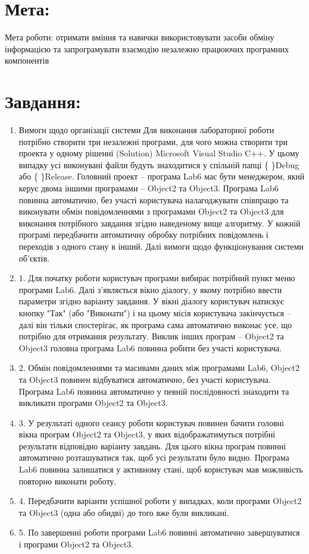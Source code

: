 \documentclass[14pt]{article}
\begin{document}

    \tableofcontents
    \newpage


    \section{Мета:}
    Мета роботи: отримати вміння та навички використовувати засоби обміну інформацією та запрограмувати взаємодію незалежно працюючих програмних компонентів


    \section{Завдання:}
    \begin{enumerate}
        \item    Вимоги щодо організації системи Для виконання лабораторної роботи потрібно створити три незалежні програми, для чого можна створити три проекта у одному рішенні (Solution) Microsoft Visual Studio C++. У цьому випадку усі виконувані файли будуть знаходитися у спільній папці \{ \}Debug або \{ \}Release. Головний проект – програма Lab6 має бути менеджером, який керує двома іншими програмами – Object2 та Object3. Програма Lab6 повинна автоматично, без участі користувача налагоджувати співпрацю та виконувати обмін повідомленнями з програмами Object2 та Object3 для виконання потрібного завдання згідно наведеному вище алгоритму. У кожній програмі передбачити автоматичну обробку потрібних повідомлень і переходів з одного стану в інший. Далі вимоги щодо функціонування системи об'єктів.
        \item    1. Для початку роботи користувач програми вибирає потрібний пункт меню програми Lab6. Далі з’являється вікно діалогу, у якому потрібно ввести параметри згідно варіанту завдання. У вікні діалогу користувач натискує кнопку "Так" (або "Виконати") і на цьому місія користувача закінчується – далі він тільки спостерігає, як програма сама автоматично виконає усе, що потрібно для отримання результату. Виклик інших програм – Object2 та Object3 головна програма Lab6 повинна робити без участі користувача.
        \item    2. Обмін повідомленнями та масивами даних між програмами Lab6, Object2 та Object3 повинен відбуватися автоматично, без участі користувача. Програма Lab6 повинна автоматично у певній послідовності знаходити та викликати програми Object2 та Object3.
        \item    3. У результаті одного сеансу роботи користувач повинен бачити головні вікна програм Object2 та Object3, у яких відображатимуться потрібні результати відповідно варіанту завдань. Для цього вікна програм повинні автоматично розташуватися так, щоб усі результати було видно. Програма Lab6 повинна залишатися у активному стані, щоб користувач мав можливість повторно виконати роботу.
        \item    4. Передбачити варіанти успішної роботи у випадках, коли програми Object2 та Object3 (одна або обидві) до того вже були викликані.
        \item    5. По завершенні роботи програми Lab6 повинні автоматично завершуватися і програми Object2 та Object3.
    \end{enumerate}
\end{document}
